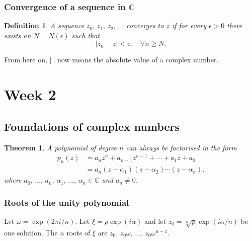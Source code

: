 \documentclass{article}
\newtheorem{theorem}{Theorem}
\newtheorem{definition}{Definition}
\begin{document}
\subsubsection{Convergence of a sequence in $\mathbb{C}$}
\begin{definition}
    A sequence $z_0,\,z_1,\,z_2,\,\ldots$ converges to $z$ if for every $\epsilon>0$ there exists an $N=N(\epsilon)$ such that
    \begin{equation}
        \vert z_n-z\vert<\epsilon,\quad \forall n\geq N.
    \end{equation}
\end{definition}
From here on, $\vert \ \vert$ now means the absolute value of a complex number.

\section{Week 2}
\subsection{Foundations of complex numbers}
\begin{theorem}
    A polynomial of degree $n$ can always be factorised in the form
    \begin{align}
        p_n(z)&=a_nz^n+a_{n-1}z^{n-1}+\cdots+a_1z+a_0 \\
        &= a_n(z-\alpha_1)(z-\alpha_2)\cdots(z-\alpha_n).
    \end{align}
    where $a_0,\,\ldots,\,a_n,\,\alpha_1,\,\ldots,\,\alpha_n\in\mathbb{C}$ and $a_n\neq0$.
\end{theorem}

\subsubsection{Roots of the unity polynomial}
Let $\omega=\exp(2\pi i/n)$. Let $\xi=\rho\exp(i\alpha)$ and let $z_0=\sqrt[n]{\rho}\exp(i\alpha/n)$ be one solution. The $n$ roots of $\xi$ are $z_0,\,z_0\omega,\,\ldots,\,z_0\omega^{n-1}$.
\end{document}
